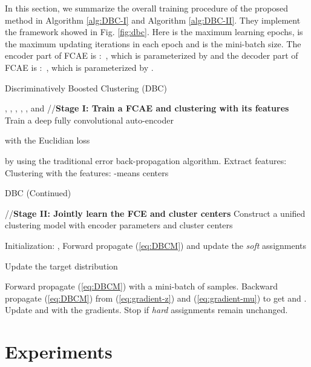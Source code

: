 \documentclass[preprint,12pt]{elsarticle}
\begin{document}
In this section, we summarize the overall training procedure of the proposed method in Algorithm \ref{alg:DBC-I} and Algorithm \ref{alg:DBC-II}. They implement the framework showed in Fig. \ref{fig:dbc}. Here  is the maximum learning
epochs,  is the maximum updating iterations in each epoch and  is the mini-batch size.
The encoder part of FCAE is :~, which is parameterized by  and
the decoder part of FCAE is :~, which is parameterized by .


\begin{algorithm}[!tbh]
\caption{Discriminatively Boosted Clustering (DBC)}
\label{alg:DBC-I}
\begin{algorithmic}[1]
\Require , , , , , 
\Ensure  and 
\Statex //\textbf{Stage I: Train a FCAE and clustering with its features}
\State Train a deep fully convolutional auto-encoder

with the Euclidian loss

by using the traditional error back-propagation algorithm.
\State Extract features: 
\State Clustering with the features:  -means centers
\end{algorithmic}
\end{algorithm}

\begin{algorithm}[!tbh]
\caption{DBC (Continued)}
\label{alg:DBC-II}
\begin{algorithmic}[1]
\Statex //\textbf{Stage II: Jointly learn the FCE and cluster centers}
\State Construct a unified clustering model with encoder parameters  and cluster centers 

\State Initialization: , 
\State Forward propagate (\ref{eq:DBCM}) and update the \textit{soft} assignments

\State Update the target distribution

\State Forward propagate (\ref{eq:DBCM}) with a mini-batch of  samples.
\State Backward propagate (\ref{eq:DBCM}) from (\ref{eq:gradient-z}) and (\ref{eq:gradient-mu})
to get  and .
\State Update  and  with the gradients.
\EndFor
\State Stop if \textit{hard} assignments remain unchanged.
\EndFor
\end{algorithmic}
\end{algorithm}

\section{Experiments}
\label{sec:experiments}
\end{document}
